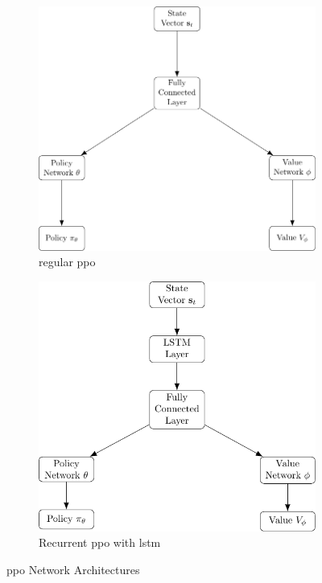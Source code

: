 \begin{figure}[ht!]
    \centering
    \begin{subfigure}{0.45\textwidth}
        \includegraphics[width=\textwidth]{./futureWork/tikz/ppo_diagram.pdf}
        \caption{regular \gls{ppo}}
        \label{subfig3:architecturePPO}
    \end{subfigure}
    \hspace{1cm}
    \begin{subfigure}{0.45\textwidth}
        \includegraphics[width=\textwidth]{./futureWork/tikz/recurrentppo_diagram.pdf}
        \caption{Recurrent \gls{ppo} with \gls{lstm}}
        \label{subfig3:architectureLSTMPPO}
    \end{subfigure}
    \caption{\gls{ppo} Network Architectures} 
    \label{fig3:architecturePPO}
\end{figure}

